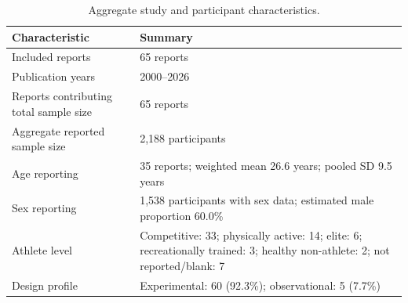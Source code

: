 \begin{table}[H]
\centering
\caption{Aggregate study and participant characteristics.}
\label{tab:baseline-aggregate}
\small
\begin{tabularx}{\textwidth}{@{}lX@{}}
\toprule
Characteristic & Summary \\
\midrule
Included reports & 65 reports \\
Publication years & 2000--2026 \\
Reports contributing total sample size & 65 reports \\
Aggregate reported sample size & 2,188 participants \\
Age reporting & 35 reports; weighted mean 26.6 years; pooled SD 9.5 years \\
Sex reporting & 1,538 participants with sex data; estimated male proportion 60.0\% \\
Athlete level & Competitive: 33; physically active: 14; elite: 6; recreationally trained: 3; healthy non-athlete: 2; not reported/blank: 7 \\
Design profile & Experimental: 60 (92.3\%); observational: 5 (7.7\%) \\
\bottomrule
\end{tabularx}
\end{table}
